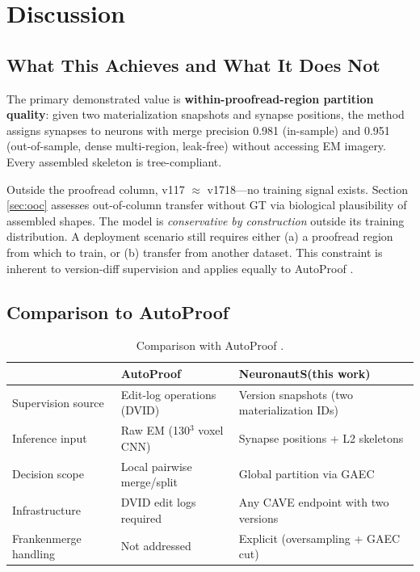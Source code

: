\documentclass[10pt,letterpaper]{article}
\newcommand{\neuronauts}{NeuronautS\xspace}
\begin{document}
\section{Discussion}

\subsection{What This Achieves and What It Does Not}

The primary demonstrated value is \textbf{within-proofread-region partition quality}:
given two materialization snapshots and synapse positions, the method assigns synapses to
neurons with merge precision 0.981 (in-sample) and 0.951 (out-of-sample, dense
multi-region, leak-free) without accessing EM imagery. Every assembled skeleton is
tree-compliant.

Outside the proofread column, v117 $\approx$ v1718---no training signal exists. Section
\ref{sec:ooc} assesses out-of-column transfer without GT via biological plausibility of
assembled shapes. The model is \emph{conservative by construction} outside its training
distribution. A deployment scenario still requires either (a) a proofread region from
which to train, or (b) transfer from another dataset. This constraint is inherent to
version-diff supervision and applies equally to AutoProof \cite{huang2025autoproof}.

\subsection{Comparison to AutoProof}

\begin{table}[h]
\centering
\caption{Comparison with AutoProof \cite{huang2025autoproof}.}
\label{tab:autoproof}
\small
\begin{tabular}{lll}
\toprule
 & AutoProof & \neuronauts (this work) \\
\midrule
Supervision source    & Edit-log operations (DVID) & Version snapshots (two materialization IDs) \\
Inference input       & Raw EM (130$^3$ voxel CNN) & Synapse positions + L2 skeletons \\
Decision scope        & Local pairwise merge/split  & Global partition via GAEC \\
Infrastructure        & DVID edit logs required     & Any CAVE endpoint with two versions \\
Frankenmerge handling & Not addressed               & Explicit (oversampling + GAEC cut) \\
\bottomrule
\end{tabular}
\end{table}
\end{document}
